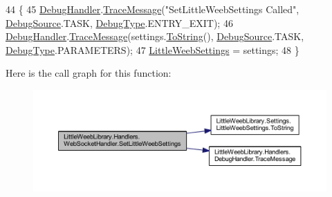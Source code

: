 \begin{DoxyCode}
44         \{
45             \mbox{\hyperlink{class_little_weeb_library_1_1_handlers_1_1_web_socket_handler_aa1474285fe938f284633c31403bf9edf}{DebugHandler}}.\mbox{\hyperlink{interface_little_weeb_library_1_1_handlers_1_1_i_debug_handler_a2e405bc3492e683cd3702fae125221bc}{TraceMessage}}(\textcolor{stringliteral}{"SetLittleWeebSettings Called"}, 
      \mbox{\hyperlink{namespace_little_weeb_library_1_1_handlers_a2a6ca0775121c9c503d58aa254d292be}{DebugSource}}.TASK, \mbox{\hyperlink{namespace_little_weeb_library_1_1_handlers_ab66019ed40462876ec4e61bb3ccb0a62}{DebugType}}.ENTRY\_EXIT);
46             \mbox{\hyperlink{class_little_weeb_library_1_1_handlers_1_1_web_socket_handler_aa1474285fe938f284633c31403bf9edf}{DebugHandler}}.\mbox{\hyperlink{interface_little_weeb_library_1_1_handlers_1_1_i_debug_handler_a2e405bc3492e683cd3702fae125221bc}{TraceMessage}}(settings.\mbox{\hyperlink{class_little_weeb_library_1_1_settings_1_1_little_weeb_settings_a5a5b722dd8e117be810022882795b6ae}{ToString}}(), 
      \mbox{\hyperlink{namespace_little_weeb_library_1_1_handlers_a2a6ca0775121c9c503d58aa254d292be}{DebugSource}}.TASK, \mbox{\hyperlink{namespace_little_weeb_library_1_1_handlers_ab66019ed40462876ec4e61bb3ccb0a62}{DebugType}}.PARAMETERS);
47             \mbox{\hyperlink{class_little_weeb_library_1_1_settings_1_1_little_weeb_settings}{LittleWeebSettings}} = settings;
48         \}
\end{DoxyCode}
Here is the call graph for this function\+:\nopagebreak
\begin{figure}[H]
\begin{center}
\leavevmode
\includegraphics[width=350pt]{class_little_weeb_library_1_1_handlers_1_1_web_socket_handler_a7ca1faf86f9796afd4c9981a7c961f3b_cgraph}
\end{center}
\end{figure}
\mbox{\label{class_little_weeb_library_1_1_handlers_1_1_web_socket_handler_a23d4ffbabdb67c97ea843d4e7dc5cbdd}} 
